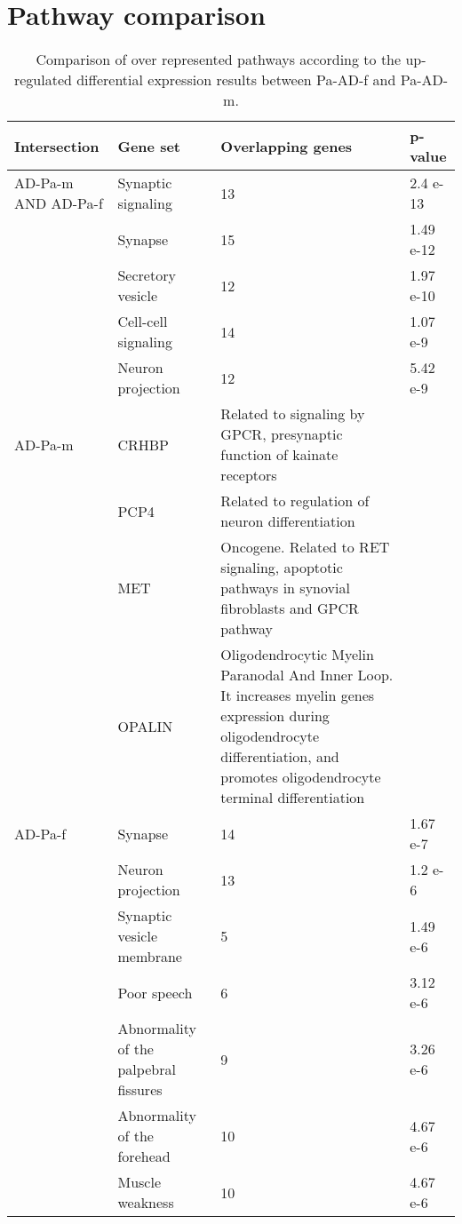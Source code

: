 \chapter{Pathway comparison} \label{paths-comparison}

\begin{table}[!ht]
\centering
\caption{Comparison of over represented pathways according to the up-regulated differential expression results between Pa-AD-f and Pa-AD-m.}
\begin{tabularx}{1.0\textwidth}{L{2cm}L{2.5cm}L{8cm}C{1.5cm}}
\toprule
\textbf{Intersection} & \textbf{Gene set} & \textbf{Overlapping genes} & \textbf{p-value} \\
\midrule
AD-Pa-m AND AD-Pa-f & Synaptic signaling & 13 & 2.4 e-13 \\
                    & Synapse & 15 & 1.49 e-12 \\
                    & Secretory vesicle & 12 & 1.97 e-10 \\
                    & Cell-cell signaling & 14 & 1.07 e-9 \\
                    & Neuron projection & 12 & 5.42 e-9 \\
AD-Pa-m &
  CRHBP &
  Related to signaling by GPCR, presynaptic function of kainate receptors &
   \\
 &
  PCP4 &
  Related to regulation of neuron differentiation &
   \\
 &
  MET &
 Oncogene. Related to RET signaling, apoptotic pathways in synovial fibroblasts and GPCR pathway &
   \\
 &
  OPALIN &
  Oligodendrocytic Myelin Paranodal And Inner Loop. It increases myelin genes expression during oligodendrocyte differentiation, and promotes oligodendrocyte terminal differentiation &
   \\
AD-Pa-f &
  Synapse &
  14 &
  1.67 e-7 \\
 &
  Neuron projection &
  13 &
  1.2 e-6 \\
 &
  Synaptic vesicle membrane &
  5 &
  1.49 e-6 \\
 &
  Poor speech &
  6 &
  3.12 e-6 \\
 &
  Abnormality of the palpebral fissures &
  9 &
  3.26 e-6 \\
 &
  Abnormality of the forehead &
  10 &
  4.67 e-6 \\
 &
  Muscle weakness &
  10 &
  4.67 e-6 \\
\bottomrule

\end{tabularx}
\end{table}


